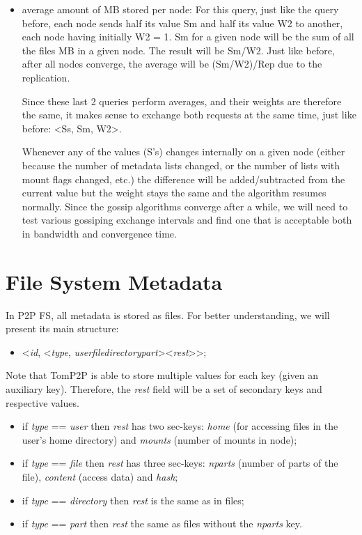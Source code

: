 \documentclass[times,9pt,article]{llncs}
\begin{document}
\begin{itemize}
\item average amount of MB stored per node:
For this query, just like the query before, each node sends half its value Sm and 
half its value W2 to another, each node having initially W2 = 1. Sm for a given node
will be the sum of all the files MB in a given node. The result will be Sm/W2. Just
like before, after all nodes converge, the average will be (Sm/W2)/Rep due to the 
replication.

Since these last 2 queries perform averages, and their weights are therefore the same,
it makes sense to exchange both requests at the same time, just like before:
\textless Ss, Sm, W2\textgreater.

Whenever any of the values (S's) changes internally on a given node (either because
the number of metadata lists changed, or the number of lists with mount flags changed,
etc.) the difference will be added/subtracted from the current value but the weight 
stays the same and the algorithm resumes normally.
Since the gossip algorithms converge after a while, we will need to test various
gossiping exchange intervals and find one that is acceptable both in bandwidth and
convergence time.

\end{itemize} 

\section{File System Metadata}


In P2P FS, all metadata is stored as files. For better understanding, we will
present its main structure:
\begin{itemize}
\item \textless \emph{id}, \textless \emph{type}, \emph{user}\textbar \emph{file}\textbar \emph{directory}\textbar \emph{part}\textgreater \textless \emph{rest}\textgreater\textgreater ;
\end{itemize}

Note that TomP2P is able to store multiple values for each key (given an 
auxiliary key). Therefore, the \emph{rest} field will be a set of secondary
keys and respective values.

\begin{itemize}
\item if \emph{type} == \emph{user} then \emph{rest} has two sec-keys: \emph{home} (for accessing files in the user's home directory) and \emph{mounts} (number of mounts in node);
\item if \emph{type} == \emph{file} then \emph{rest} has three sec-keys: \emph{nparts} (number of parts of the file), \emph{content} (access data) and \emph{hash};
\item if \emph{type} == \emph{directory} then \emph{rest} is the same as in files;
\item if \emph{type} == \emph{part} then \emph{rest} the same as files without the \emph{nparts} key.
\end{itemize}
\end{document}
